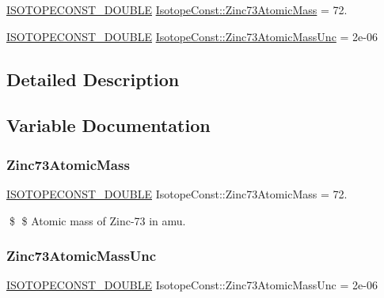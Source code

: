 \begin{DoxyCompactItemize}
\item 
\mbox{\hyperlink{group___isotope_const-_macros_ga8f45a7272ce02c0b4c65c44636ed719a}{I\+S\+O\+T\+O\+P\+E\+C\+O\+N\+S\+T\+\_\+\+D\+O\+U\+B\+LE}} \mbox{\hyperlink{group___isotope_const-_zinc-_zn73_ga433c093c4f93b440eed160a9350cdf57}{Isotope\+Const\+::\+Zinc73\+Atomic\+Mass}} = 72.
\item 
\mbox{\hyperlink{group___isotope_const-_macros_ga8f45a7272ce02c0b4c65c44636ed719a}{I\+S\+O\+T\+O\+P\+E\+C\+O\+N\+S\+T\+\_\+\+D\+O\+U\+B\+LE}} \mbox{\hyperlink{group___isotope_const-_zinc-_zn73_ga12e51998a772c3e4d194c0696044a29c}{Isotope\+Const\+::\+Zinc73\+Atomic\+Mass\+Unc}} = 2e-\/06
\end{DoxyCompactItemize}


\subsection{Detailed Description}


\subsection{Variable Documentation}
\mbox{\label{group___isotope_const-_zinc-_zn73_ga433c093c4f93b440eed160a9350cdf57}} 
\subsubsection{\texorpdfstring{Zinc73\+Atomic\+Mass}{Zinc73AtomicMass}}
{\footnotesize\ttfamily \mbox{\hyperlink{group___isotope_const-_macros_ga8f45a7272ce02c0b4c65c44636ed719a}{I\+S\+O\+T\+O\+P\+E\+C\+O\+N\+S\+T\+\_\+\+D\+O\+U\+B\+LE}} Isotope\+Const\+::\+Zinc73\+Atomic\+Mass = 72.}

\$ \$ Atomic mass of Zinc-\/73 in amu. \mbox{\label{group___isotope_const-_zinc-_zn73_ga12e51998a772c3e4d194c0696044a29c}} 
\subsubsection{\texorpdfstring{Zinc73\+Atomic\+Mass\+Unc}{Zinc73AtomicMassUnc}}
{\footnotesize\ttfamily \mbox{\hyperlink{group___isotope_const-_macros_ga8f45a7272ce02c0b4c65c44636ed719a}{I\+S\+O\+T\+O\+P\+E\+C\+O\+N\+S\+T\+\_\+\+D\+O\+U\+B\+LE}} Isotope\+Const\+::\+Zinc73\+Atomic\+Mass\+Unc = 2e-\/06}

